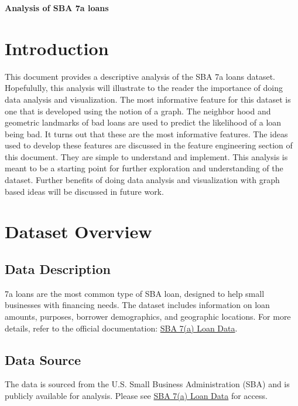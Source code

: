 \documentclass[12pt]{article}
\begin{document}
\begin{tcolorbox}[halign=flush center]
         \textbf{Analysis of SBA 7a loans}
   
 \end{tcolorbox}

\section{Introduction}
This document provides a descriptive analysis of the SBA 7a loans dataset. Hopefulully, this analysis will illustrate to the reader the importance of doing data analysis and visualization. The most informative feature for this dataset is one that is developed using the notion of a graph. The neighbor hood and geometric landmarks of bad loans are used to predict the likelihood of a loan being bad. It turns out that these are the most informative features. The ideas used to develop these features are discussed in the feature engineering section of this document. They are simple to understand and implement. This analysis is meant to be a starting point for further exploration and understanding of the dataset. Further benefits of doing data analysis and visualization with graph based ideas will be discussed in future work.

\section{Dataset Overview}
\subsection{Data Description}
7a loans are the most common type of SBA loan, designed to help small businesses with financing needs. The dataset includes information on loan amounts, purposes, borrower demographics, and geographic locations. For more details, refer to the official documentation: \href{https://www.sba.gov/partners/lenders/7a-loan-program/types-7a-loans}{SBA 7(a) Loan Data}.
\subsection{Data Source}
The data is sourced from the U.S. Small Business Administration (SBA) and is publicly available for analysis. Please see \href{https://data.sba.gov/dataset/7-a-504-foia}{SBA 7(a) Loan Data} for access.
\end{document}
